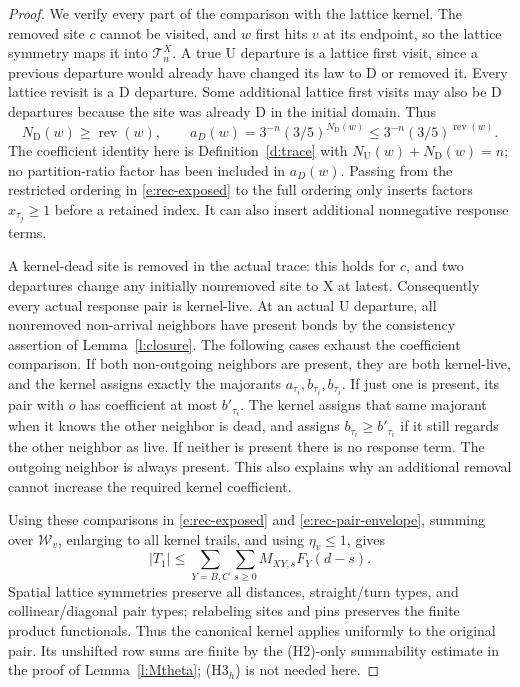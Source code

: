 \begin{proof}
We verify every part of the comparison with the lattice kernel.
The removed site \(c\) cannot be visited, and \(w\) first hits
\(v\) at its endpoint, so the lattice symmetry maps it into
\(\mathcal T_n^X\).  A true \(\mathrm U\) departure is a
lattice first visit, since a previous departure would already have
changed its law to \(\mathrm D\) or removed it.  Every lattice
revisit is a \(\mathrm D\) departure.  Some additional lattice
first visits may also be \(\mathrm D\) departures because the
site was already \(\mathrm D\) in the initial domain.  Thus
\[
 N_{\mathrm D}(w)\ge\operatorname{rev}(w),\qquad
 a_D(w)=3^{-n}(3/5)^{N_{\mathrm D}(w)}
             \le3^{-n}(3/5)^{\operatorname{rev}(w)}.
\]
The coefficient identity here is Definition~\ref{d:trace} with
\(N_{\mathrm U}(w)+N_{\mathrm D}(w)=n\); no partition-ratio
factor has been included in \(a_D(w)\).
Passing from the restricted ordering in \eqref{e:rec-exposed}
to the full ordering only inserts factors \(x_{\tau_j}\ge1\)
before a retained index.  It can also insert additional nonnegative
response terms.

A kernel-dead site is removed in the actual trace: this holds for
\(c\), and two departures change any initially nonremoved site
to \(\mathrm X\) at latest.  Consequently every actual response
pair is kernel-live.  At an actual \(\mathrm U\) departure, all
nonremoved non-arrival neighbors have present bonds by the
consistency assertion of Lemma~\ref{l:closure}.  The following
cases exhaust the coefficient comparison.  If both non-outgoing
neighbors are present, they are both kernel-live, and the kernel
assigns exactly the majorants \(a_{\tau_i},b_{\tau_i},b_{\tau_i}\).
If just one is present, its pair with \(o\) has coefficient
at most \(b'_{\tau_i}\).  The kernel assigns that same majorant
when it knows the other neighbor is dead, and assigns
\(b_{\tau_i}\ge b'_{\tau_i}\) if it still regards the other
neighbor as live.  If neither is present there is no response
term.  The outgoing neighbor is always present.  This also
explains why an additional removal cannot increase the required
kernel coefficient.

Using these comparisons in \eqref{e:rec-exposed} and
\eqref{e:rec-pair-envelope}, summing over \(\mathcal W_v\),
enlarging to all kernel trails, and using \(\eta_v\le1\), gives
\begin{equation}\label{e:rec-T1}
 |T_1|\le\sum_{Y=B,C}\sum_{s\ge0}M_{XY,s}F_Y(d-s).
\end{equation}
Spatial lattice symmetries preserve all distances, straight/turn
types, and collinear/diagonal pair types; relabeling sites and pins
preserves the finite product functionals.  Thus the canonical
kernel applies uniformly to the original pair.  Its unshifted
row sums are finite by the (H2)-only summability estimate in the
proof of Lemma~\ref{l:Mtheta}; (H3\(_h\)) is not needed here.


\end{proof}
